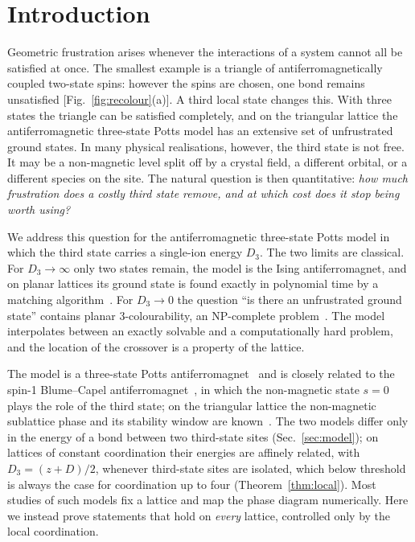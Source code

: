 \documentclass[aps,pre,twocolumn,floatfix,10pt]{revtex4-2}
\theoremstyle{definition}
\theoremstyle{remark}
\begin{document}
\section{Introduction}
\label{sec:intro}
Geometric frustration arises whenever the interactions of a system cannot all be satisfied at
once. The smallest example is a triangle of antiferromagnetically coupled two-state spins: however
the spins are chosen, one bond remains unsatisfied [Fig.~\ref{fig:recolour}(a)]. A third local state changes this. With three
states the triangle can be satisfied completely, and on the triangular lattice the
antiferromagnetic three-state Potts model has an extensive set of unfrustrated ground states.
In many physical realisations, however, the third state is not free. It may be a non-magnetic
level split off by a crystal field, a different orbital, or a different species on the site.
The natural question is then quantitative: \emph{how much frustration does a costly third state
remove, and at which cost does it stop being worth using?}

We address this question for the antiferromagnetic three-state Potts model in which the third
state carries a single-ion energy $D_3$. The two limits are classical. For $D_3\to\infty$ only
two states remain, the model is the Ising antiferromagnet, and on planar lattices its ground state
is found exactly in polynomial time by a matching algorithm~\cite{Hadlock1975,Bieche1980,Barahona1982}.
For $D_3\to0$ the question ``is there an unfrustrated ground state'' contains planar
3-colourability, an NP-complete problem~\cite{GareyJohnsonStockmeyer1976}. The model interpolates
between an exactly solvable and a computationally hard problem, and the location of the crossover
is a property of the lattice.

The model is a three-state Potts antiferromagnet~\cite{Wu1982} and is closely related to the
spin-1 Blume--Capel antiferromagnet~\cite{Blume1966,Capel1966}, in which the
non-magnetic state $s=0$ plays the role of the third state; on the triangular lattice the
non-magnetic sublattice phase and its stability window are known~\cite{Zukovic2013}. The
two models differ only in the energy of a bond between two third-state sites
(Sec.~\ref{sec:model}); on lattices of constant coordination their energies are affinely related,
with $D_3=(z+D)/2$, whenever third-state sites are isolated, which below threshold is always the
case for coordination up to four (Theorem~\ref{thm:local}). Most studies of such models fix a lattice and map the phase diagram
numerically. Here we instead prove statements that hold on \emph{every} lattice, controlled only
by the local coordination.
\end{document}

